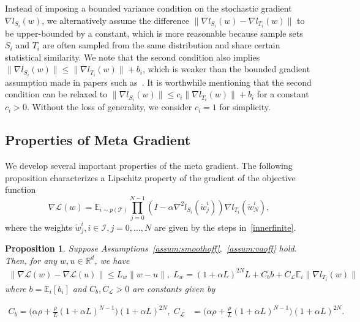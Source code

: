 \documentclass{osudissert96}
\newtheorem{proposition}{Proposition}
\begin{document}
Instead of  imposing a  bounded variance condition on the stochastic gradient $\nabla l_{S_i}(w)$, we alternatively assume the difference $\|\nabla l_{S_i}(w)-\nabla  l_{T_i}(w)\|$ to be upper-bounded by  a constant, which is more reasonable because sample sets $S_i$ and $T_i$ are often sampled from the same distribution and share certain statistical similarity. We note that the second condition also implies $\|\nabla l_{S_i}(w)\| \leq \| \nabla l_{T_i}(w)\|+ b_i$, which  is weaker than the bounded gradient assumption made in papers such as~\cite{finn2019online}. 
It is worthwhile mentioning that the second condition can be relaxed to $\|\nabla l_{S_i}(w)\| \leq c_i\| \nabla l_{T_i}(w)\|+ b_i$ for a constant $c_i>0$. Without the loss of generality, we consider $c_i=1$ for simplicity.

\subsection*{Properties of Meta Gradient}
We develop several important properties of the meta gradient. 
The following proposition characterizes a Lipschitz property of the gradient  of the objective function   $$\nabla \mathcal{L}(w) =  \mathbb{E}_{i\sim p(\mathcal{T})} \prod_{j=0}^{N-1}(I - \alpha \nabla^2 l_{S_i}(\widetilde w_{j}^i))\nabla l_{T_i}(\widetilde w_{N}^i),$$ where the weights $ \widetilde w_{j}^i, i\in \mathcal{I}, j=0,..., N$ are given by the steps in~\cref{innerfinite}. 
\begin{proposition}\label{finite:lip} 
	Suppose Assumptions~\ref{assum:smoothoff},~\ref{assum:vaoff} hold.  Then, for any $w,u\in\mathbb{R}^d$, we have 
	\begin{align*}
	\|\nabla \mathcal{L}(w) - \nabla \mathcal{L}(u)\| \leq L_{w}\|w-u\|,\; L_{w} = (1+\alpha L)^{2N}L + C_bb + C_{\mathcal{L}} \mathbb{E}_{i}\|\nabla l_{T_i}(w)\|
	\end{align*}
	where $b=\mathbb{E}_{i} [b_i]$ and $C_b, C_{\mathcal{L}} >0$ are constants given by  
	\begin{small}
	\begin{align}\label{cl1ss}
	C_b= \big( \alpha \rho + \frac{\rho}{L} (1+\alpha L)^{N-1}  \big)(1+\alpha L)^{2N}, \;C_{\mathcal{L}} &= \big( \alpha \rho + \frac{\rho}{L}  (1+\alpha L)^{N-1} \big) (1+\alpha L)^{2N}.
	\end{align}
	\end{small}
\end{proposition}
\end{document}
